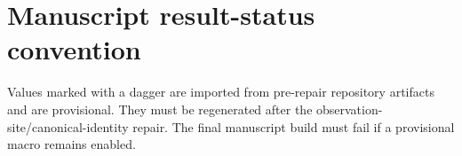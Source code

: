 \documentclass[preprint,12pt,authoryear]{elsarticle}
\begin{document}
\DraftBanner








\appendix
\section{Manuscript result-status convention}
\label{app:result-status}
Values marked with a dagger are imported from pre-repair repository artifacts and are provisional. They must be regenerated after the observation-site/canonical-identity repair. The final manuscript build must fail if a provisional macro remains enabled.



\end{document}
